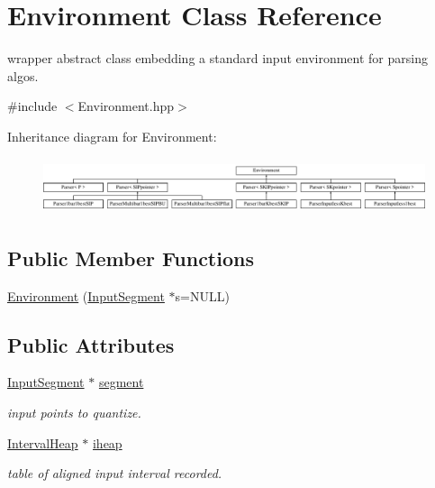 \hypertarget{classEnvironment}{}\section{Environment Class Reference}
\label{classEnvironment}


wrapper abstract class embedding a standard input environment for parsing algos.  




{\ttfamily \#include $<$Environment.\+hpp$>$}

Inheritance diagram for Environment\+:\begin{figure}[H]
\begin{center}
\leavevmode
\includegraphics[height=1.647059cm]{classEnvironment}
\end{center}
\end{figure}
\subsection*{Public Member Functions}
\begin{DoxyCompactItemize}
\item 
\mbox{\hyperlink{group__segment_ga35cbd86caf5c17f8d59559ae0b28febf}{Environment}} (\mbox{\hyperlink{classInputSegment}{Input\+Segment}} $\ast$s=N\+U\+LL)
\end{DoxyCompactItemize}
\subsection*{Public Attributes}
\begin{DoxyCompactItemize}
\item 
\mbox{\hyperlink{classInputSegment}{Input\+Segment}} $\ast$ \mbox{\hyperlink{classEnvironment_a740b0264644db40cb5a657f7ed52bb23}{segment}}
\begin{DoxyCompactList}\small\item\em input points to quantize. \end{DoxyCompactList}\item 
\mbox{\hyperlink{classIntervalHeap}{Interval\+Heap}} $\ast$ \mbox{\hyperlink{classEnvironment_a810e4b1bd5bd6428c78c18fbeba127f6}{iheap}}
\begin{DoxyCompactList}\small\item\em table of aligned input interval recorded. \end{DoxyCompactList}\end{DoxyCompactItemize}


